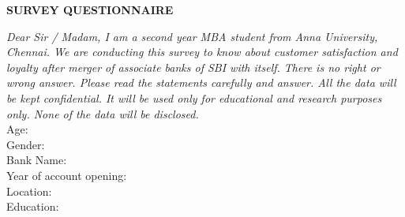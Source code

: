\documentclass[10pt,a4paper]{article}
\begin{document}
\begin{center}
\textbf{SURVEY QUESTIONNAIRE}
\end{center}
\emph{Dear Sir / Madam, I am a second year MBA student from Anna University, Chennai. We are conducting this survey to know about customer satisfaction and loyalty after merger of associate banks of SBI with itself. There is no right or wrong answer. Please read the statements carefully and answer. All the data will be kept confidential. It will be used only for educational and research purposes only. None of the data will be disclosed.}\\
\noindent\makebox[\linewidth]{\rule{\paperwidth}{0.4pt}}
Age:\\
Gender:\\
Bank Name:\\
Year of account opening:\\
Location:\\
Education:\\
\noindent\makebox[\linewidth]{\rule{\paperwidth}{0.4pt}}
\end{document}
